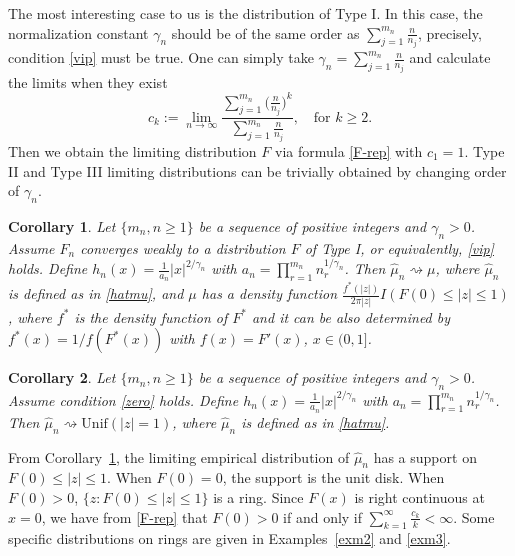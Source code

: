 \documentclass[11pt]{article}
\newtheorem{corollary}{\textbf{Corollary}}[section]
\newtheorem{rem}{\textbf{Remark}}
\numberwithin{equation}{section}
\begin{document}



The most interesting case to us is the distribution of Type I. In
this case, the normalization constant $\gamma_n$ should be of the
same order as  $\sum^{m_n}_{j=1}\frac{n}{n_j}$, precisely, condition
\eqref{vip} must be true. One can simply take
$\gamma_n=\sum^{m_n}_{j=1}\frac{n}{n_j}$ and calculate the limits
when they exist
\[
c_k:=\lim_{n\to\infty}\frac{\sum^{m_n}_{j=1}\big(\frac{n}{n_j}\big)^k}{\sum^{m_n}_{j=1}\frac{n}{n_j}},
~~~\mbox{ for }k\ge 2.
\]
Then we obtain the limiting distribution $F$ via formula
\eqref{F-rep} with $c_1=1$. Type II and Type III limiting
distributions can be trivially obtained by changing order of
$\gamma_n$.




\begin{corollary}\label{typeI}
Let $\{m_n, n\geq 1\}$ be a sequence of positive integers and
$\gamma_n>0$. Assume $F_n$ converges weakly to a distribution $F$ of
Type I, or equivalently, \eqref{vip} holds. Define
$h_n(x)=\frac{1}{a_n}|x|^{2/\gamma_{n}}$ with
$a_n=\prod_{r=1}^{m_n}n_r^{1/\gamma_{n}}$. Then
$\hat\mu_n\rightsquigarrow \mu$, where $\hat\mu_n$ is defined as in
\eqref{hatmu}, and $\mu$ has a density function $
\frac{f^*(|z|)}{2\pi|z|}I(F(0)\le |z|\le 1)$, where $f^*$ is the
density function of $F^*$ and it can be also determined by
$f^*(x)=1/f(F^*(x))$ with $f(x)=F'(x)$, $x\in (0,1]$.
\end{corollary}


\begin{corollary}\label{typeII}
Let $\{m_n, n\geq 1\}$ be a sequence of positive integers and
$\gamma_n>0$. Assume condition \eqref{zero} holds. Define
$h_n(x)=\frac{1}{a_n}|x|^{2/\gamma_{n}}$ with
$a_n=\prod_{r=1}^{m_n}n_r^{1/\gamma_{n}}$. Then
$\hat\mu_n\rightsquigarrow \mathrm{Unif}(|z|=1)$, where $\hat\mu_n$
is defined as in \eqref{hatmu}.
\end{corollary}




From Corollary~\ref{typeI},  the limiting empirical distribution of
$\hat\mu_n$ has a support on $F(0)\le |z|\le 1$.  When $F(0)=0$, the
support is the unit disk. When $F(0)>0$,  $\{z: F(0)\le |z|\le 1\}$
is a ring. Since $F(x)$ is right continuous at $x=0$, we have from
\eqref{F-rep} that $F(0)>0$ if and only if $\sum^\infty_{k=1}
\frac{c_k}{k}<\infty$.  Some specific distributions on rings are
given in Examples~\ref{exm2} and \ref{exm3}.
\end{document}
